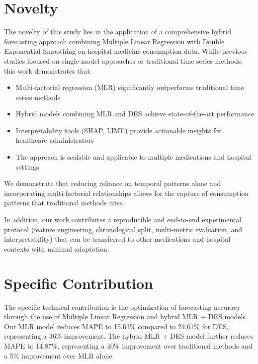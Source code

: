 \documentclass[conference]{IEEEtran}
\begin{document}
\section{Novelty}

The novelty of this study lies in the application of a comprehensive hybrid forecasting approach combining Multiple Linear Regression with Double Exponential Smoothing on hospital medicine consumption data. While previous studies focused on single-model approaches or traditional time series methods, this work demonstrates that:

\begin{itemize}
    \item Multi-factorial regression (MLR) significantly outperforms traditional time series methods
    \item Hybrid models combining MLR and DES achieve state-of-the-art performance
    \item Interpretability tools (SHAP, LIME) provide actionable insights for healthcare administrators
    \item The approach is scalable and applicable to multiple medications and hospital settings
\end{itemize}

We demonstrate that reducing reliance on temporal patterns alone and incorporating multi-factorial relationships allows for the capture of consumption patterns that traditional methods miss.

In addition, our work contributes a reproducible and end-to-end experimental protocol (feature engineering, chronological split, multi-metric evaluation, and interpretability) that can be transferred to other medications and hospital contexts with minimal adaptation.

\section{Specific Contribution}

The specific technical contribution is the optimization of forecasting accuracy through the use of Multiple Linear Regression and hybrid MLR + DES models. Our MLR model reduces MAPE to 15.63\% compared to 24.61\% for DES, representing a 36\% improvement. The hybrid MLR + DES model further reduces MAPE to 14.87\%, representing a 40\% improvement over traditional methods and a 5\% improvement over MLR alone.
\end{document}
